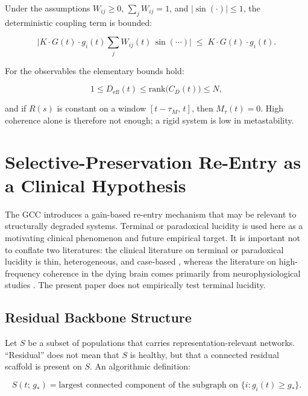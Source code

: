 \documentclass[11pt,a4paper]{article}
\theoremstyle{plain}
\theoremstyle{definition}
\theoremstyle{remark}
\newcommand{\Deff}{D_{\mathrm{eff}}}
\newcommand{\Mtau}{M_{\tau}}
\begin{document}
Under the assumptions $W_{ij} \geq 0$, $\sum_j W_{ij} = 1$, and $|\sin(\cdot)| \leq 1$, the deterministic coupling term is bounded:

\begin{equation}
\bigl|K \cdot G(t) \cdot g_i(t) \sum_j W_{ij}(t)\,\sin(\cdots)\bigr| \;\leq\; K \cdot G(t) \cdot g_i(t).
\end{equation}

For the observables the elementary bounds hold:

\begin{equation}
1 \leq \Deff(t) \leq \mathrm{rank}\bigl(C_D(t)\bigr) \leq N,
\end{equation}

and if $R(s)$ is constant on a window $[t-\tau_M,\,t]$, then $\Mtau(t) = 0$. High coherence alone is therefore not enough; a rigid system is low in metastability.


\section{Selective-Preservation Re-Entry as a Clinical Hypothesis}
\label{sec:TL}

The GCC introduces a gain-based re-entry mechanism that may be relevant to structurally degraded systems. Terminal or paradoxical lucidity is used here as a motivating clinical phenomenon and future empirical target. It is important not to conflate two literatures: the clinical literature on terminal or paradoxical lucidity is thin, heterogeneous, and case-based \citep{nahm2012,gilmore2023,batthyany2017}, whereas the literature on high-frequency coherence in the dying brain comes primarily from neurophysiological studies \citep{borjigin2013,xu2023}. The present paper does not empirically test terminal lucidity.

\subsection{Residual Backbone Structure}

Let $S$ be a subset of populations that carries representation-relevant networks. ``Residual'' does not mean that $S$ is healthy, but that a connected residual scaffold is present on $S$. An algorithmic definition:

\begin{equation}
\label{eq:backbone}
S(t;\,g_*) = \text{largest connected component of the subgraph on } \{i : g_i(t) \geq g_*\}.
\end{equation}
\end{document}
